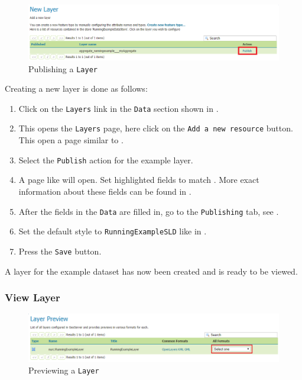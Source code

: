 \begin{figure}[t]
	\centering
	\includegraphics[width=\textwidth]{Figures/Publishlayer.png}
	\caption{Publishing a \lstinline|Layer|\label{fig:publishlayer}}
\end{figure}

Creating a new layer is done as follows:

\begin{enumerate}[resume]
	\item Click on the \lstinline|Layers| link in the \lstinline|Data|
		section shown in .
	\item This opens the \lstinline|Layers| page, here click on the
		\lstinline|Add a new resource| button. This open a page similar to
		.
	\item Select the \lstinline|Publish| action for the example layer.
	\item A page like  will open. Set highlighted
		fields to match . More exact information
		about these fields can be found in .
	\item After the fields in the \lstinline|Data| are filled in, go to
		the \lstinline|Publishing| tab, see .
	\item Set the default style to \lstinline|RunningExampleSLD| like
		in .
	\item Press the \lstinline|Save| button.
\end{enumerate}

A layer for the example dataset has now been created and is ready to be
viewed.

\subsubsection{View Layer}

\begin{figure}[t]
\centering
\includegraphics[width=\textwidth]{Figures/LayerPreview.png}
\caption{Previewing a \lstinline|Layer|\label{fig:preview}}
\end{figure}

